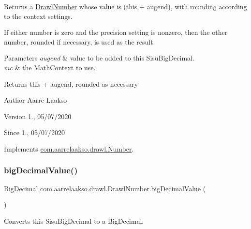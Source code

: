 Returns a \hyperlink{classcom_1_1aarrelaakso_1_1drawl_1_1_drawl_number}{Drawl\+Number} whose value is (this + augend), with rounding according to the context settings. 

If either number is zero and the precision setting is nonzero, then the other number, rounded if necessary, is used as the result.


\begin{DoxyParams}{Parameters}
{\em augend} & value to be added to this Sisu\+Big\+Decimal. \\
\hline
{\em mc} & the Math\+Context to use. \\
\hline
\end{DoxyParams}
\begin{DoxyReturn}{Returns}
this + augend, rounded as necessary 
\end{DoxyReturn}
\begin{DoxyAuthor}{Author}
Aarre Laakso 
\end{DoxyAuthor}
\begin{DoxyVersion}{Version}
1., 05/07/2020 
\end{DoxyVersion}
\begin{DoxySince}{Since}
1., 05/07/2020 
\end{DoxySince}


Implements \hyperlink{interfacecom_1_1aarrelaakso_1_1drawl_1_1_number_ad71ea7d41bcc751bc6e08ccd0d5f9885}{com.\+aarrelaakso.\+drawl.\+Number}.

\mbox{\label{classcom_1_1aarrelaakso_1_1drawl_1_1_drawl_number_acf97abc572acd173a4d8cd6c5b5c2ecd}} 
\subsubsection{\texorpdfstring{big\+Decimal\+Value()}{bigDecimalValue()}}
{\footnotesize\ttfamily Big\+Decimal com.\+aarrelaakso.\+drawl.\+Drawl\+Number.\+big\+Decimal\+Value (\begin{DoxyParamCaption}{ }\end{DoxyParamCaption})}



Converts this Sisu\+Big\+Decimal to a Big\+Decimal. 

